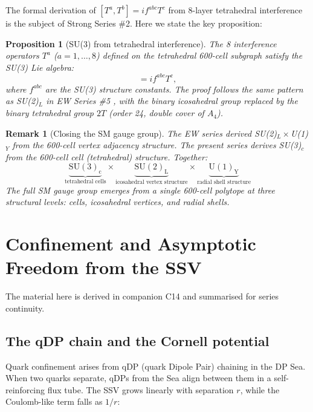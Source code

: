 \documentclass[11pt,a4paper]{article}
\newtheorem{proposition}[theorem]{Proposition}
\newtheorem{remark}[theorem]{Remark}
\begin{document}
The formal derivation of $[T^a, T^b] = if^{abc}T^c$ from 8-layer
tetrahedral interference is the subject of Strong Series \#2.
Here we state the key proposition:

\begin{proposition}[SU(3) from tetrahedral interference]
\label{prop:su3}
The 8 interference operators $T^a$ ($a=1,\ldots,8$) defined on the
tetrahedral 600-cell subgraph satisfy the SU(3) Lie algebra:
\begin{equation}
[T^a, T^b] = if^{abc}T^c,
\label{eq:su3}
\end{equation}
where $f^{abc}$ are the SU(3) structure constants.  The proof
follows the same pattern as SU(2)$_L$ in EW Series \#5
\citep{cpp_ew5}, with the binary icosahedral group replaced by
the binary tetrahedral group $2T$ (order 24, double cover of $A_4$).
\end{proposition}

\begin{remark}[Closing the SM gauge group]
The EW series derived SU(2)$_L \times $U(1)$_Y$ from the 600-cell
vertex adjacency structure.  The present series derives SU(3)$_c$
from the 600-cell cell (tetrahedral) structure.  Together:
\[
\underbrace{\mathrm{SU(3)_c}}_{\text{tetrahedral cells}}
\times
\underbrace{\mathrm{SU(2)_L}}_{\text{icosahedral vertex structure}}
\times
\underbrace{\mathrm{U(1)_Y}}_{\text{radial shell structure}}
\]
The full SM gauge group emerges from a single 600-cell polytope
at three structural levels: cells, icosahedral vertices, and
radial shells.
\end{remark}

\section{Confinement and Asymptotic Freedom from the SSV}
\label{sec:confinement}

The material here is derived in companion C14 \citep{c14} and
summarised for series continuity.

\subsection{The qDP chain and the Cornell potential}

Quark confinement arises from qDP (quark Dipole Pair) chaining in
the DP Sea.  When two quarks separate, qDPs from the Sea align
between them in a self-reinforcing flux tube.  The SSV grows
linearly with separation $r$, while the Coulomb-like term falls
as $1/r$:
\end{document}

